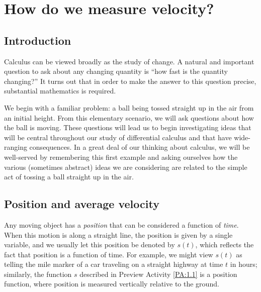 \section{How do we measure velocity?} \label{S:1.1.Velocity}

\vspace*{-14 pt}

\subsection*{Introduction}

Calculus can be viewed broadly as the study of change.  A natural and important question to ask about any changing quantity is ``how fast is the quantity changing?''  It turns out that in order to make the answer to this question precise, substantial mathematics is required.  

We begin with a familiar problem:  a ball being tossed straight up in the air from an initial height.  From this elementary scenario, we will ask questions about how the ball is moving.  These questions will lead us to begin investigating ideas that will be central throughout our study of differential calculus and that have wide-ranging consequences.  In a great deal of our thinking about calculus, we will be well-served by remembering this first example and asking ourselves how the various (sometimes abstract) ideas we are considering are related to the simple act of tossing a ball straight up in the air.  



\subsection*{Position and average velocity}

Any moving object has a \emph{position} that can be considered a function of \emph{time}.  When this motion is along a straight line, the position is given by a single variable, and we usually let this position be denoted by $s(t)$, which reflects the fact that position is a function of time.  For example, we might view $s(t)$ as telling the mile marker of a car traveling on a straight highway at time $t$ in hours; similarly, the function $s$ described in Preview Activity \ref{PA:1.1} is a position function, where position is measured vertically relative to the ground.

